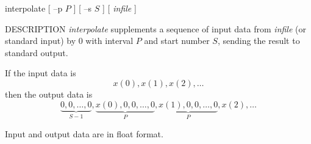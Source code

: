% 
% 
% 
% 
%                                                                        
%
\hypertarget{interpolate}{}

\begin{synopsis}
\item[interpolate] [ --p $P$ ] [ --s $S$ ] [ {\em infile} ]
\end{synopsis}

\begin{qsection}{DESCRIPTION}
{\em interpolate} supplements a sequence of input data
from {\em infile} (or standard input)
by 0 with interval $P$ and start number $S$,
sending the result to standard output.

If the input data is
\begin{displaymath}
 x(0), x(1), x(2), \dots
\end{displaymath}
then the output data is
\begin{displaymath}
\underbrace{0, 0, \dots, 0}_{S-1},\underbrace{x(0), 0, 0, \dots, 0}_{P},\underbrace{x(1), 0, 0, \dots, 0}_{P},x(2), \dots
\end{displaymath}
\par
Input and output data are in float format.
\end{qsection}

